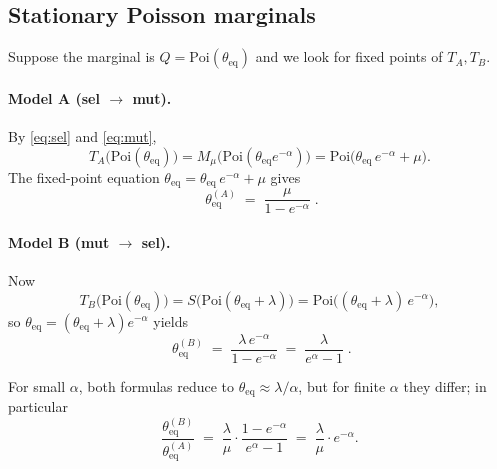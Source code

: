 \documentclass[11pt]{article}
\newcommand{\Poi}{\mathrm{Poi}}
\begin{document}
\subsection*{Stationary Poisson marginals}
Suppose the marginal is $Q=\Poi(\theta_{\mathrm{eq}})$ and we look for
fixed points of $T_A,T_B$.

\paragraph{Model A (sel $\to$ mut).}
By \eqref{eq:sel} and \eqref{eq:mut},
\[
  T_A\bigl(\Poi(\theta_{\mathrm{eq}})\bigr)
  = M_\mu\bigl(\Poi(\theta_{\mathrm{eq}}e^{-\alpha})\bigr)
  = \Poi\bigl(\theta_{\mathrm{eq}}\,e^{-\alpha}+\mu\bigr).
\]
The fixed-point equation
$\theta_{\mathrm{eq}}=\theta_{\mathrm{eq}}\,e^{-\alpha}+\mu$ gives
\begin{equation}\label{eq:thetaA}
  \boxed{\;\theta_{\mathrm{eq}}^{(A)}\;=\;\frac{\mu}{1-e^{-\alpha}}\;.}
\end{equation}

\paragraph{Model B (mut $\to$ sel).}
Now
\[
  T_B\bigl(\Poi(\theta_{\mathrm{eq}})\bigr)
  = S\bigl(\Poi(\theta_{\mathrm{eq}}+\lambda)\bigr)
  = \Poi\bigl((\theta_{\mathrm{eq}}+\lambda)\,e^{-\alpha}\bigr),
\]
so $\theta_{\mathrm{eq}}=(\theta_{\mathrm{eq}}+\lambda)e^{-\alpha}$ yields
\begin{equation}\label{eq:thetaB}
  \boxed{\;\theta_{\mathrm{eq}}^{(B)}
        \;=\;\frac{\lambda\,e^{-\alpha}}{1-e^{-\alpha}}
        \;=\;\frac{\lambda}{e^{\alpha}-1}\;.}
\end{equation}

For small $\alpha$, both formulas reduce to $\theta_{\mathrm{eq}}\approx\lambda/\alpha$, but for
finite $\alpha$ they differ; in particular
\[
  \frac{\theta_{\mathrm{eq}}^{(B)}}{\theta_{\mathrm{eq}}^{(A)}}
  \;=\;\frac{\lambda}{\mu}\cdot\frac{1-e^{-\alpha}}{e^{\alpha}-1}
  \;=\;\frac{\lambda}{\mu}\cdot e^{-\alpha}.
\]
\end{document}
